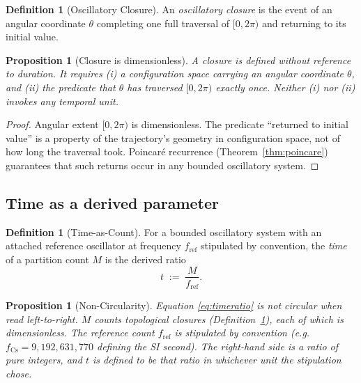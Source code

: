 \documentclass[twocolumn,10pt,a4paper]{article}
\theoremstyle{thmstyle}
\newtheorem{proposition}[theorem]{Proposition}
\theoremstyle{definition}
\newtheorem{definition}[theorem]{Definition}
\theoremstyle{remark}
\begin{document}
\begin{definition}[Oscillatory Closure]
\label{def:closure}
An \emph{oscillatory closure} is the event of an angular coordinate
$\theta$ completing one full traversal of $[0,2\pi)$ and returning to
its initial value.
\end{definition}

\begin{proposition}[Closure is dimensionless]
\label{prop:closure}
A closure is defined without reference to duration. It requires (i) a
configuration space carrying an angular coordinate $\theta$, and (ii)
the predicate that $\theta$ has traversed $[0,2\pi)$ exactly once.
Neither (i) nor (ii) invokes any temporal unit.
\end{proposition}

\begin{proof}
Angular extent $[0,2\pi)$ is dimensionless. The predicate ``returned
to initial value'' is a property of the trajectory's geometry in
configuration space, not of how long the traversal took. Poincar\'{e}
recurrence (Theorem~\ref{thm:poincare}) guarantees that such returns
occur in any bounded oscillatory system.
\end{proof}

\subsection{Time as a derived parameter}

\begin{definition}[Time-as-Count]
\label{def:timecount}
For a bounded oscillatory system with an attached reference
oscillator at frequency $f_{\mathrm{ref}}$ stipulated by convention,
the \emph{time} of a partition count $M$ is the derived ratio
\begin{equation}
t\;:=\;\frac{M}{f_{\mathrm{ref}}}.
\label{eq:timeratio}
\end{equation}
\end{definition}

\begin{proposition}[Non-Circularity]
\label{prop:nocirc}
Equation \eqref{eq:timeratio} is not circular when read left-to-right.
$M$ counts topological closures (Definition~\ref{def:closure}), each
of which is dimensionless. The reference count $f_{\mathrm{ref}}$ is
stipulated by convention (e.g.\ $f_{\mathrm{Cs}}=9{,}192{,}631{,}770$
defining the SI second). The right-hand side is a ratio of pure
integers, and $t$ is defined to be that ratio in whichever unit the
stipulation chose.
\end{proposition}
\end{document}
